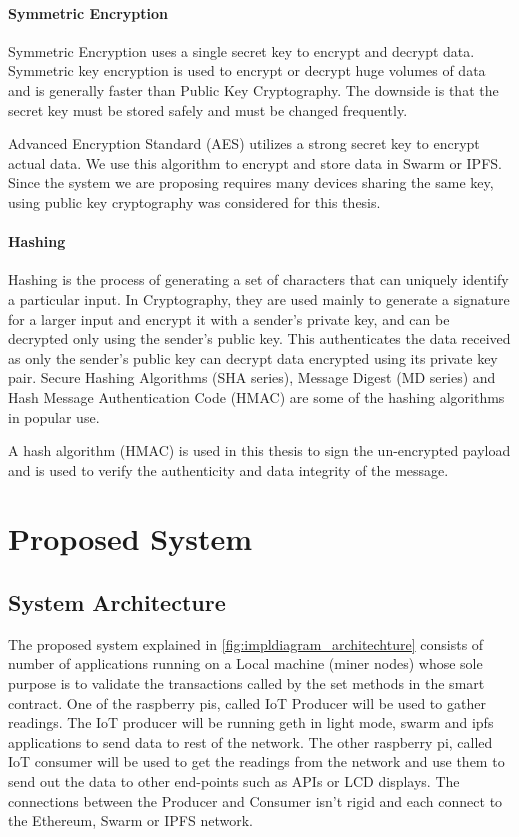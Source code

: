 \documentclass[11pt,openright]{report}
\begin{document}
\subsubsection{Symmetric Encryption}
Symmetric Encryption uses a single secret key to encrypt and decrypt data. Symmetric key encryption is used to encrypt or decrypt huge volumes of data and is generally faster than Public Key Cryptography. The downside is that the secret key must be stored safely and must be changed frequently.

Advanced Encryption Standard (AES) utilizes a strong secret key to encrypt actual data. We use this algorithm to encrypt and store data in Swarm or IPFS. Since the system we are proposing requires many devices sharing the same key, using public key cryptography was considered for this thesis. 

\subsubsection{Hashing}
Hashing is the process of generating a set of characters that can uniquely identify a particular input. In Cryptography, they are used mainly to generate a signature for a larger input and encrypt it with a sender's private key, and can be decrypted only using the sender's public key. This authenticates the data received as only the sender's public key can decrypt data encrypted using its private key pair. Secure Hashing Algorithms (SHA series), Message Digest (MD series) and Hash Message Authentication Code (HMAC) are some of the hashing algorithms in popular use.

A hash algorithm (HMAC) is used in this thesis to sign the un-encrypted payload and is used to verify the authenticity and data integrity of the message. 



\chapter{Proposed System} \label{chapter:proposed_system}

\section{System Architecture} \label{ss:construct_architecture}
The proposed system explained in \ref{fig:impldiagram_architechture} consists of number of applications running on a Local machine (miner nodes) whose sole purpose is to validate the transactions called by the set methods in the smart contract. One of the raspberry pis, called IoT Producer will be used to gather readings. The IoT producer will be running geth in light mode, swarm and ipfs applications to send data to rest of the network. The other raspberry pi, called IoT consumer will be used to get the readings from the network and use them to send out the data to other end-points such as APIs or LCD displays. The connections between the Producer and Consumer isn't rigid and each connect to the Ethereum, Swarm or IPFS network.
\end{document}
